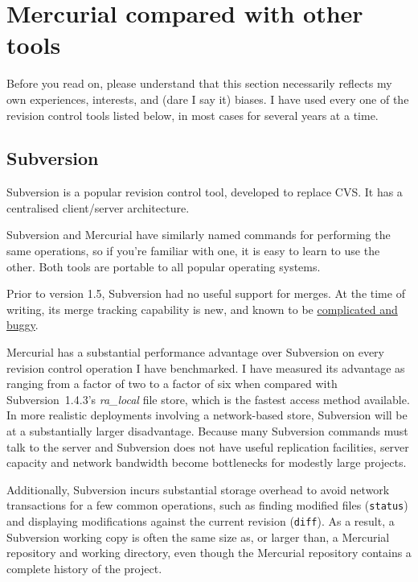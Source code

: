 \section{Mercurial compared with other tools}

Before you read on, please understand that this section necessarily
reflects my own experiences, interests, and (dare I say it) biases.  I
have used every one of the revision control tools listed below, in
most cases for several years at a time.


\subsection{Subversion}

Subversion is a popular revision control tool, developed to replace
CVS.  It has a centralised client/server architecture.

Subversion and Mercurial have similarly named commands for performing
the same operations, so if you're familiar with one, it is easy to
learn to use the other.  Both tools are portable to all popular
operating systems.

Prior to version 1.5, Subversion had no useful support for merges.
At the time of writing, its merge tracking capability is new, and known to be
\href{http://svnbook.red-bean.com/nightly/en/svn.branchmerge.advanced.html#svn.branchmerge.advanced.finalword}{complicated
  and buggy}.

Mercurial has a substantial performance advantage over Subversion on
every revision control operation I have benchmarked.  I have measured
its advantage as ranging from a factor of two to a factor of six when
compared with Subversion~1.4.3's \emph{ra\_local} file store, which is
the fastest access method available.  In more realistic deployments
involving a network-based store, Subversion will be at a substantially
larger disadvantage.  Because many Subversion commands must talk to
the server and Subversion does not have useful replication facilities,
server capacity and network bandwidth become bottlenecks for modestly
large projects.

Additionally, Subversion incurs substantial storage overhead to avoid
network transactions for a few common operations, such as finding
modified files (\texttt{status}) and displaying modifications against
the current revision (\texttt{diff}).  As a result, a Subversion
working copy is often the same size as, or larger than, a Mercurial
repository and working directory, even though the Mercurial repository
contains a complete history of the project.

